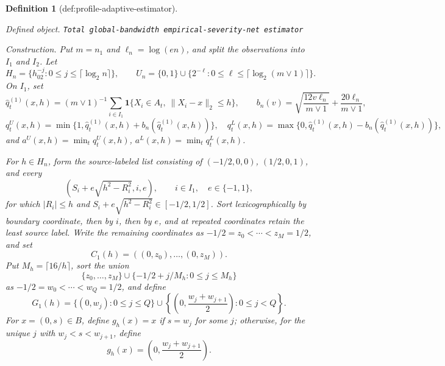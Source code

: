 \documentclass{article}
\newtheorem{definition}{Definition}
\begin{document}
\begin{definition}[def:profile-adaptive-estimator]\label{def:profile-adaptive-estimator}
\par\smallskip\noindent\emph{Defined object.} \texttt{Total global-\allowbreak{}bandwidth empirical-\allowbreak{}severity-\allowbreak{}net estimator}
\par\smallskip\noindent\emph{Construction.} Put \(m=n_1\) and \(\ell_n=\log(en)\), and split the observations into \(I_1\) and \(I_2\).  Let
\[
 H_n=\{h_02^{-j}:0\leq j\leq\lceil\log_2n\rceil\},
 \qquad
 U_n=\{0,1\}\cup
 \{2^{-\ell}:0\leq\ell\leq\lceil\log_2(m\vee1)\rceil\}.
\]
On \(I_1\), set
\[
 \widehat q^{(1)}_t(x,h)
 =(m\vee1)^{-1}\sum_{i\in I_1}
 \mathbf 1\{X_i\in A_t,\ \|X_i-x\|_2\leq h\},
 \qquad
 b_n(v)=\sqrt{\frac{12v\ell_n}{m\vee1}}
       +\frac{20\ell_n}{m\vee1},
\]
\[
 q^U_t(x,h)=\min\{1,\widehat q^{(1)}_t(x,h)+b_n(\widehat q^{(1)}_t(x,h))\},
 \quad
 q^L_t(x,h)=\max\{0,\widehat q^{(1)}_t(x,h)-b_n(\widehat q^{(1)}_t(x,h))\},
\]
and \(a^U(x,h)=\min_tq^U_t(x,h)\), \(a^L(x,h)=\min_tq^L_t(x,h)\).

For \(h\in H_n\), form the source-labeled list consisting of
\((-1/2,0,0)\), \((1/2,0,1)\), and every
\[
 \left(S_i+e\sqrt{h^2-R_i^2},i,e\right),
 \qquad i\in I_1,\quad e\in\{-1,1\},
\]
for which \(|R_i|\leq h\) and
\(S_i+e\sqrt{h^2-R_i^2}\in[-1/2,1/2]\).
Sort lexicographically by boundary coordinate, then by \(i\), then by \(e\),
and at repeated coordinates retain the least source label.  Write the
remaining coordinates as
\(-1/2=z_0<\cdots<z_M=1/2\), and set
\[
 C_1(h)=((0,z_0),\ldots,(0,z_M)).
\]
Put \(M_h=\lceil16/h\rceil\), sort the union
\[
 \{z_0,\ldots,z_M\}\cup
 \{-1/2+j/M_h:0\leq j\leq M_h\}
\]
as \(-1/2=w_0<\cdots<w_Q=1/2\), and define
\[
 G_1(h)=\{(0,w_j):0\leq j\leq Q\}
 \cup
 \left\{\left(0,\frac{w_j+w_{j+1}}2\right):0\leq j<Q\right\}.
\]
For \(x=(0,s)\in B\), define \(g_h(x)=x\) if \(s=w_j\) for some \(j\);
otherwise, for the unique \(j\) with \(w_j<s<w_{j+1}\), define
\[
 g_h(x)=\left(0,\frac{w_j+w_{j+1}}2\right).
\]


\end{definition}
\end{document}
